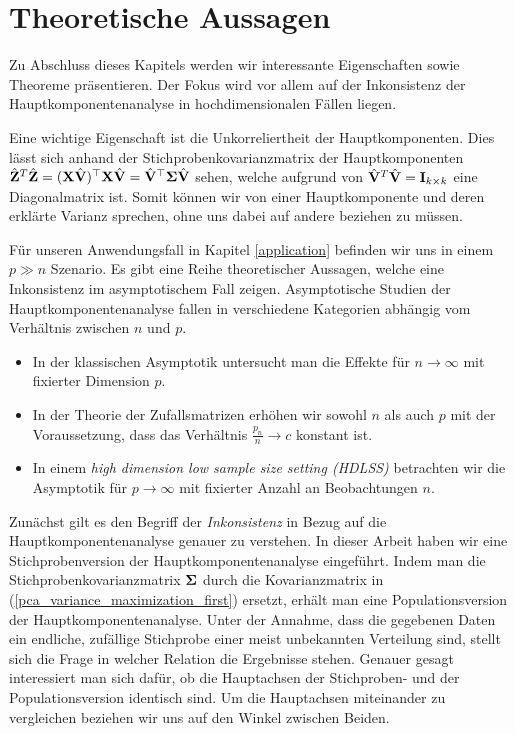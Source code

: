 

\section{Theoretische Aussagen}
\label{pca_theorems}

Zu Abschluss dieses Kapitels werden wir interessante Eigenschaften sowie Theoreme präsentieren. Der Fokus wird vor allem auf der Inkonsistenz der Hauptkomponentenanalyse in hochdimensionalen Fällen liegen.

Eine wichtige Eigenschaft ist die Unkorreliertheit der Hauptkomponenten. Dies lässt sich anhand der Stichprobenkovarianzmatrix der Hauptkomponenten $\hat{\mathbf{Z}}^T \hat{\mathbf{Z}} = (\mathbf{X} \hat{\mathbf{V}})^{\top}\mathbf{X} \hat{\mathbf{V}} = \hat{\mathbf{V}}^{\top}\mathbf{\Sigma}\hat{\mathbf{V}}$ sehen, welche aufgrund von $\hat{\mathbf{V}}^T \hat{\mathbf{V}} = \mathbf{I}_{k \times k}$ eine Diagonalmatrix ist. Somit können wir von einer Hauptkomponente und deren erklärte Varianz sprechen, ohne uns dabei auf andere beziehen zu müssen.

Für unseren Anwendungsfall in Kapitel \ref{application} befinden wir uns in einem $p \gg n$ Szenario. Es gibt eine Reihe theoretischer Aussagen, welche eine Inkonsistenz im asymptotischem Fall zeigen. Asymptotische Studien der Hauptkomponentenanalyse fallen in verschiedene Kategorien abhängig vom Verhältnis zwischen $n$ und $p$.
\begin{itemize}
\item In der klassischen Asymptotik untersucht man die Effekte für $n \rightarrow \infty$ mit fixierter Dimension $p$.
\item In der Theorie der Zufallsmatrizen erhöhen wir sowohl $n$ als auch $p$ mit der Voraussetzung, dass das Verhältnis $\frac{p_n}{n}\rightarrow c$ konstant ist.
\item In einem \textit{high dimension low sample size setting (HDLSS)} betrachten wir die Asymptotik für $p \rightarrow \infty$ mit fixierter Anzahl an Beobachtungen $n$.
\end{itemize}
Zunächst gilt es den Begriff der \textit{Inkonsistenz} in Bezug auf die Hauptkomponentenanalyse genauer zu verstehen. In dieser Arbeit haben wir eine Stichprobenversion der Hauptkomponentenanalyse eingeführt. Indem man die Stichprobenkovarianzmatrix $\mathbf{\Sigma}$ durch die Kovarianzmatrix in (\ref{pca_variance_maximization_first}) ersetzt, erhält man eine Populationsversion der Hauptkomponentenanalyse. Unter der Annahme, dass die gegebenen Daten ein endliche, zufällige Stichprobe einer meist unbekannten Verteilung sind, stellt sich die Frage in welcher Relation die Ergebnisse stehen. Genauer gesagt interessiert man sich dafür, ob die Hauptachsen der Stichproben- und der Populationsversion identisch sind. Um die Hauptachsen miteinander zu vergleichen beziehen wir uns auf den Winkel zwischen Beiden.

